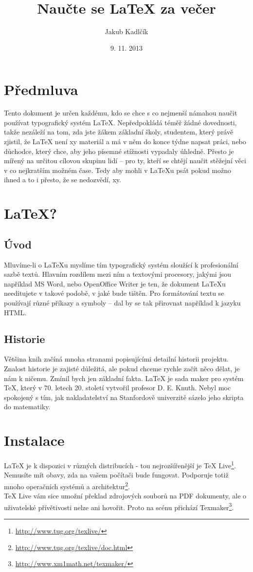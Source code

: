\documentclass[10pt,a4paper]{article}
\title{Naučte se \LaTeX{} za večer}
\author{Jakub Kadlčík}
\date{9. 11. 2013}
\begin{document}
	\maketitle
	\newpage

	\section*{Předmluva}
	Tento dokument je určen každému, kdo se chce s co nejmenší námahou naučit používat typografický systém LaTeX. Nepředpokládá téměř žádné dovednosti, takže nezáleží na tom, zda jste žákem základní školy, studentem, který právě zjistil, že LaTeX není xy materiál a má v něm do konce týdne napsat práci, nebo důchodce, který chce, aby jeho písemné stížnosti vypadaly úhledně.
	Přesto je mířený na určitou cílovou skupinu lidí -- pro ty, kteří se chtějí naučit stěžejní věci v co nejkratším možném čase. Tedy aby mohli v LaTeXu psát pokud možno ihned a to i přesto, že se nedozvědí, xy.

	\newpage
	\tableofcontents
	\newpage

    \section{LaTeX?}
		\subsection{Úvod}
		Mluvíme-li o LaTeXu myslíme tím typografický systém sloužící k profesionální sazbě textů. Hlavním rozdílem mezi ním a textovými procesory, jakými jsou například MS Word, nebo OpenOffice Writer je ten, že dokument LaTeXu needitujete v takové podobě, v jaké bude tištěn. Pro formátování textu se používají různé příkazy a symboly -- dal by se tak přirovnat například k jazyku HTML.

		\subsection{Historie}
		Většina knih začíná mnoha stranami popisujícími detailní historii projektu. Znalost historie je zajisté důležitá, ale pokud chceme rychle začít něco dělat, je nám k ničemu. Zmínil bych jen základní fakta. LaTeX je sada maker pro systém TeX, který v 70. letech 20. století vytvořil profesor D. E. Knuth. Nebyl moc spokojený s tím, jak nakladatelství na  Stanfordově univerzitě sázelo jeho skripta do matematiky.

	\newpage
	\section{Instalace}
		LaTeX je k dispozici v různých distribucích - tou nejrozšířenější je TeX Live\footnote{\url{http://www.tug.org/texlive/}}. Nemusíte mít obavy, zda na vašem počítači bude fungovat. Podporuje totiž mnoho operačních systémů a architektur\footnote{\url{http://www.tug.org/texlive/doc.html}}.
		\\
		TeX Live vám sice umožní překlad zdrojových souborů na PDF dokumenty, ale o uživatelské přívětivosti nelze ani hovořit. Proto na scénu přichází Texmaker\footnote{\url{http://www.xm1math.net/texmaker/}}.
\end{document}
